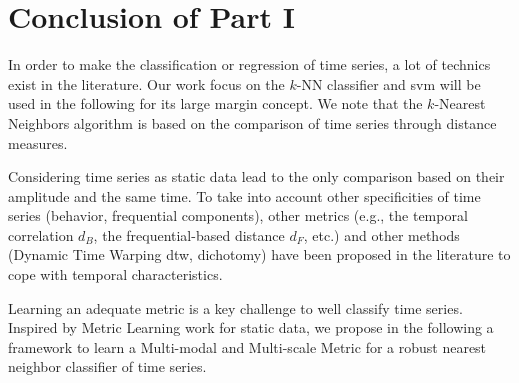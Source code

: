 \part*{Conclusion of Part I}
In order to make the classification or regression of time series, a lot of technics exist in the literature. Our work focus on the $k$-NN classifier and {\sc svm} will be used in the following for its large margin concept. We note that the $k$-Nearest Neighbors algorithm is based on the comparison of time series through distance measures. 

Considering time series as static data lead to the only comparison based on their amplitude and the same time. To take into account other specificities of time series (behavior, frequential components), other metrics (e.g., the temporal correlation $d_B$, the frequential-based distance $d_F$, etc.) and other methods (Dynamic Time Warping {\sc dtw}, dichotomy) have been proposed in the literature to cope with temporal characteristics. 

Learning an adequate metric is a key challenge to well classify time series. Inspired by Metric Learning work for static data, we propose in the following a framework to learn a Multi-modal and Multi-scale Metric for a robust nearest neighbor classifier of time series.
